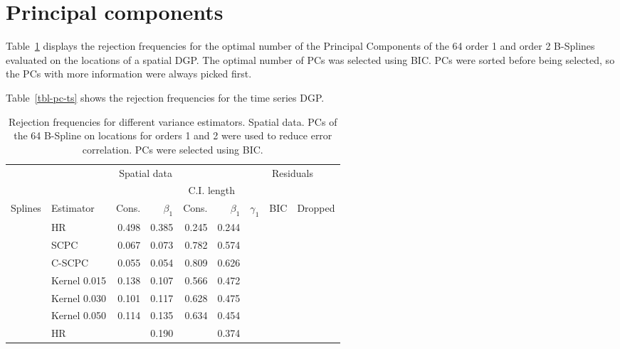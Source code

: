 \documentclass[
]{article}
\begin{document}
\hypertarget{principal-components}{%
\section{Principal components}\label{principal-components}}

Table~\ref{tbl-pc} displays the rejection frequencies for the optimal
number of the Principal Components of the 64 order 1 and order 2
B-Splines evaluated on the locations of a spatial DGP. The optimal
number of PCs was selected using BIC. PCs were sorted before being
selected, so the PCs with more information were always picked first.

Table~\ref{tbl-pc-ts} shows the rejection frequencies for the time
series DGP.

\hypertarget{tbl-pc}{}
\begin{longtable}[t]{llrrrrrrr}
\caption{\label{tbl-pc}Rejection frequencies for different variance estimators. Spatial data.
PCs of the 64 B-Spline on locations for orders 1 and 2 were used to
reduce error correlation. PCs were selected using BIC. }\tabularnewline

\toprule
\multicolumn{1}{c}{ } & \multicolumn{5}{c}{Spatial data} & \multicolumn{3}{c}{Residuals} \\
\cmidrule(l{3pt}r{3pt}){2-6} \cmidrule(l{3pt}r{3pt}){7-9}
\multicolumn{4}{c}{ } & \multicolumn{2}{c}{C.I. length} \\
\cmidrule(l{3pt}r{3pt}){5-6}
Splines & Estimator & Cons. & $\beta_1$ & Cons.  & $\beta_1$  & $\gamma_1$ & BIC & Dropped\\
\midrule
 & HR & 0.498 & 0.385 & 0.245 & 0.244 &  &  & \\

 & SCPC & 0.067 & 0.073 & 0.782 & 0.574 &  &  & \\

 & C-SCPC & 0.055 & 0.054 & 0.809 & 0.626 &  &  & \\

 & Kernel 0.015 & 0.138 & 0.107 & 0.566 & 0.472 &  &  & \\

 & Kernel 0.030 & 0.101 & 0.117 & 0.628 & 0.475 &  &  & \\

\multirow[t]{-6}{*}{\raggedright\arraybackslash } & Kernel 0.050 & 0.114 & 0.135 & 0.634 & 0.454 & \multirow[t]{-6}{*}{\raggedleft\arraybackslash 0.770} & \multirow[t]{-6}{*}{\raggedleft\arraybackslash 708.622} & \multirow[t]{-6}{*}{\raggedleft\arraybackslash }\\
\cmidrule{1-9}
 & HR &  & 0.190 &  & 0.374 &  &  & \\


\end{longtable}
\end{document}
